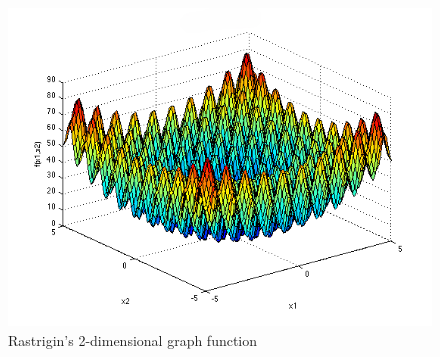 \documentclass{article}
\begin{document}
\begin{figure}[!h]
\includegraphics[width=\textwidth,height=\textheight,keepaspectratio]{rastrigin.png}
  \caption{Rastrigin's 2-dimensional graph function \cite{sf-uni-ra}}
\end{figure}

    
\end{document}
